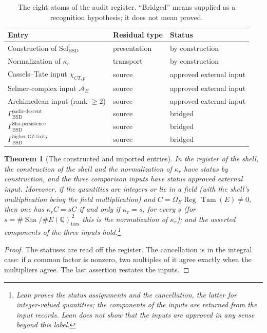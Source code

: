 \documentclass[11pt]{article}
\newtheorem{theorem}{Theorem}[section]
\theoremstyle{definition}
\newcommand{\Q}{\mathbb{Q}}
\newcommand{\Sha}{\operatorname{Sha}}
\newcommand{\Reg}{\operatorname{Reg}}
\newcommand{\Tam}{\operatorname{Tam}}
\newcommand{\tors}{\operatorname{tors}}
\newcommand{\kapr}{\kappa_r}
\newcommand{\SelBSD}{\mathrm{Sel}^{!}_{\mathrm{BSD}}}   \newcommand{\rhoE}{\rho_E}                              \newcommand{\PiBSD}{\Pi_{\mathrm{BSD}}}                 \newcommand{\GammaPD}{\Gamma_{\mathrm{BSD}}^{\mathrm{padic\text{-}descent}}}
\newcommand{\GammaSP}{\Gamma_{\mathrm{BSD}}^{\mathrm{Sha\text{-}persistence}}}
\newcommand{\GammaGZ}{\Gamma_{\mathrm{BSD}}^{\mathrm{higher\text{-}GZ\text{-}fixity}}}
\newcommand{\chiCTp}{\chi_{CT,p}}                       \newcommand{\AofE}{\mathcal{A}_E}                        \newcommand{\etap}{\eta_p}                              \newcommand{\RefStable}{\mathbf{RefStable\,AOR}}
\begin{document}
\begin{table}[tbp]
\centering
\small
\caption{The eight atoms of the audit register.  ``Bridged'' means
supplied as a recognition hypothesis; it does not mean proved.}
\label{tab:aor-discharge-register}
\begin{tabularx}{\textwidth}{@{}>{\raggedright\arraybackslash}p{}
>{\raggedright\arraybackslash}p{}
>{\raggedright\arraybackslash}X@{}}
\toprule
Entry & Residual type & Status \\
\midrule
Construction of \(\SelBSD\) & presentation & by construction \\
Normalization of \(\kapr\) & transport & by construction \\
Cassels--Tate input \(\chiCTp\) & source & approved external input \\
Selmer-complex input \(\AofE\) & source & approved external input \\
Archimedean input (rank \(\ge2\)) & source & approved external input \\
\(\GammaPD\) & source & bridged \\
\(\GammaSP\) & source & bridged \\
\(\GammaGZ\) & source & bridged \\
\bottomrule
\end{tabularx}
\end{table}
 
\begin{theorem}[The constructed and imported entries]\label{thm:closure:aor-mechanical-records}
In the register of the shell, the construction of the shell and the
normalization of $\kapr$ have status by construction, and the three
comparison inputs have status approved external input.  Moreover, if the
quantities are integers or lie in a field (with the shell's multiplication
being the field multiplication) and $C=\Omega_E\Reg\,\Tam(E)\neq0$, then
one has $\kapr C=sC$ if and only if
$\kapr=s$, for every $s$ (for $s=\#\Sha/\#E(\Q)_{\tors}^{\,2}$ this is
the normalization of $\kapr$); and the asserted components of the three
inputs hold.\footnote{Lean proves the status assignments and the cancellation, the
latter for integer-valued quantities; the components of the inputs are
returned from the input records.  Lean does not show that the inputs are
approved in any sense beyond this label.}
\end{theorem}

\begin{proof}
The statuses are read off the register.  The cancellation is
\citet[Section~13]{TsiokosBSDApparatus2026} in the integral case: if a
common factor is nonzero, two multiples of it agree exactly when the
multipliers agree.  The last assertion restates the inputs.
\end{proof}
\end{document}
